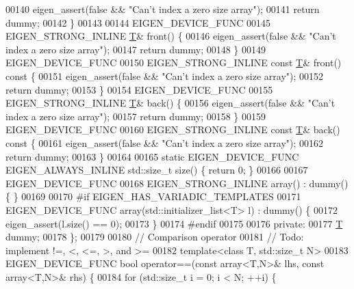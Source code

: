 \begin{DoxyCode}
00140     eigen\_assert(\textcolor{keyword}{false} && \textcolor{stringliteral}{"Can't index a zero size array"});
00141     \textcolor{keywordflow}{return} dummy;
00142   \}
00143 
00144   EIGEN\_DEVICE\_FUNC
00145   EIGEN\_STRONG\_INLINE \hyperlink{group___sparse_core___module_class_eigen_1_1_triplet}{T}& front() \{
00146     eigen\_assert(\textcolor{keyword}{false} && \textcolor{stringliteral}{"Can't index a zero size array"});
00147     \textcolor{keywordflow}{return} dummy;
00148   \}
00149   EIGEN\_DEVICE\_FUNC
00150   EIGEN\_STRONG\_INLINE \textcolor{keyword}{const} \hyperlink{group___sparse_core___module_class_eigen_1_1_triplet}{T}& front()\textcolor{keyword}{ const }\{
00151     eigen\_assert(\textcolor{keyword}{false} && \textcolor{stringliteral}{"Can't index a zero size array"});
00152     \textcolor{keywordflow}{return} dummy;
00153   \}
00154   EIGEN\_DEVICE\_FUNC
00155   EIGEN\_STRONG\_INLINE \hyperlink{group___sparse_core___module_class_eigen_1_1_triplet}{T}& back() \{
00156     eigen\_assert(\textcolor{keyword}{false} && \textcolor{stringliteral}{"Can't index a zero size array"});
00157     \textcolor{keywordflow}{return} dummy;
00158   \}
00159   EIGEN\_DEVICE\_FUNC
00160   EIGEN\_STRONG\_INLINE \textcolor{keyword}{const} \hyperlink{group___sparse_core___module_class_eigen_1_1_triplet}{T}& back()\textcolor{keyword}{ const }\{
00161     eigen\_assert(\textcolor{keyword}{false} && \textcolor{stringliteral}{"Can't index a zero size array"});
00162     \textcolor{keywordflow}{return} dummy;
00163   \}
00164 
00165   \textcolor{keyword}{static} EIGEN\_DEVICE\_FUNC EIGEN\_ALWAYS\_INLINE std::size\_t size() \{ \textcolor{keywordflow}{return} 0; \}
00166 
00167   EIGEN\_DEVICE\_FUNC
00168   EIGEN\_STRONG\_INLINE array() : dummy() \{ \}
00169 
00170 \textcolor{preprocessor}{#if EIGEN\_HAS\_VARIADIC\_TEMPLATES}
00171   EIGEN\_DEVICE\_FUNC array(std::initializer\_list<T> l) : dummy() \{
00172     eigen\_assert(l.size() == 0);
00173   \}
00174 \textcolor{preprocessor}{#endif}
00175 
00176  \textcolor{keyword}{private}:
00177   \hyperlink{group___sparse_core___module_class_eigen_1_1_triplet}{T} dummy;
00178 \};
00179 
00180 \textcolor{comment}{// Comparison operator}
00181 \textcolor{comment}{// Todo: implement !=, <, <=, >,  and >=}
00182 \textcolor{keyword}{template}<\textcolor{keyword}{class} T, std::\textcolor{keywordtype}{size\_t} N>
00183 EIGEN\_DEVICE\_FUNC \textcolor{keywordtype}{bool} operator==(\textcolor{keyword}{const} array<T,N>& lhs, \textcolor{keyword}{const} array<T,N>& rhs) \{
00184   \textcolor{keywordflow}{for} (std::size\_t i = 0; i < N; ++i) \{

\end{DoxyCode}
